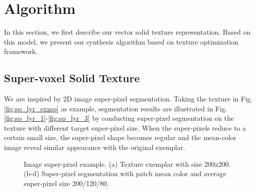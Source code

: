 \section{Algorithm}
\label{sec:algo}
In this section, we first describe our vector solid texture representation. Based on this model, we present our synthesis algorithm based on texture optimization framework.

\subsection{Super-voxel Solid Texture}
\label{subsec:avvt_repre}
We are inspired by 2D image super-pixel segmentation. Taking the texture in Fig. \ref{fig:sp_lyr_exmp} as example, segmentation results are illustrated in Fig. \ref{fig:sp_lyr_1}-\ref{fig:sp_lyr_3} by conducting super-pixel segmentation on the texture with different target super-pixel size. When the super-pixels reduce to a certain small size, the super-pixel shape becomes regular and the mean-color image reveal similar appearance with the original exemplar.
\begin{figure}[ht!]
	\centering
	\caption{Image super-pixel example. (a) Texture exemplar with size 200x200. (b-d) Super-pixel segmentation with patch mean color and average super-pixel size 200/120/80.}
	\label{fig:superpixel_lyrs}
\end{figure}

